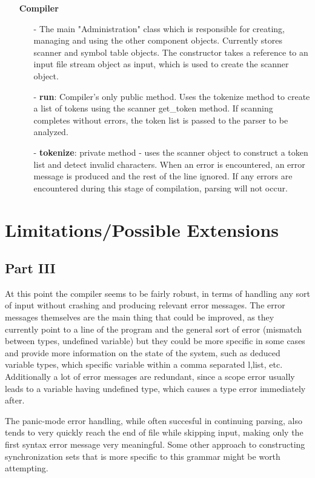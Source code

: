 \documentclass{article}
\begin{document}
\begin{itemize}
        \item[]\textbf{Compiler}
            \begin{itemize}
                \item[-] The main "Administration" class which is responsible for creating, managing and using the other component objects. Currently stores scanner and symbol table objects. The constructor takes a reference to an input file stream object as input, which is used to create the scanner object. 
                \item[-] \textbf{run}: Compiler's only public method. Uses the tokenize method to create a list of tokens using the scanner get\_token method. If scanning completes without errors, the token list is passed to the parser to be analyzed.
                \item[-] \textbf{tokenize}: private method - uses the scanner object to construct a token list and detect invalid characters. When an error is encountered, an error message is produced and the rest of the line ignored. If any errors are encountered during this stage of compilation, parsing will not occur.
            \end{itemize}

    \end{itemize}

    \section{Limitations/Possible Extensions}

        \subsection{Part III}

        At this point the compiler seems to be fairly robust, in terms of handling any sort of input without crashing and producing relevant error messages. The error messages themselves are the main thing that could be improved, as they currently point to a line of the program and the general sort of error (mismatch between types, undefined variable) but they could be more specific in some cases and provide more information on the state of the system, such as deduced variable types, which specific variable within a comma separated l,list, etc. Additionally a lot of error messages are redundant, since a scope error usually leads to a variable having undefined type, which causes a type error immediately after. 

        The panic-mode error handling, while often succesful in continuing parsing, also tends to very quickly reach the end of file while skipping input, making only the first syntax error message very meaningful. Some other approach to constructing synchronization sets that is more specific to this grammar might be worth attempting. 
\end{document}
